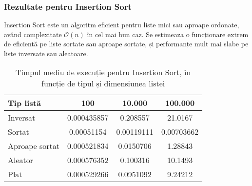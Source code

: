 \documentclass{article}
\begin{document}
\subsubsection{Rezultate pentru Insertion Sort}
Insertion Sort este un algoritm eficient pentru liste mici sau aproape ordonate, având complexitate $\mathcal{O}(n)$ în cel mai bun caz. Se estimeaza o funcționare extrem de eficientă pe liste sortate sau aproape sortate, și performanțe mult mai slabe pe liste inversate sau aleatoare.


\begin{table}[H]
\centering
\begin{tabular}{|l|c|c|c|}
\hline
\textbf{Tip listă} & \textbf{100} & \textbf{10.000} & \textbf{100.000} \\
\hline
Inversat & 0.000435857 & 0.208557 & 21.0167 \\
\hline
Sortat & 0.00051154 & 0.00119111 & 0.00703662 \\
\hline
Aproape sortat & 0.000521834 & 0.0150706 & 1.28843 \\
\hline
Aleator & 0.000576352 & 0.100316 & 10.1493 \\
\hline
Plat & 0.000529266 & 0.0951092 & 9.24212 \\
\hline
\end{tabular}
\caption{Timpul mediu de execuție pentru Insertion Sort, în funcție de tipul și dimensiunea listei}
\label{tab:rezultate-insertion}
\end{table}
\end{document}
